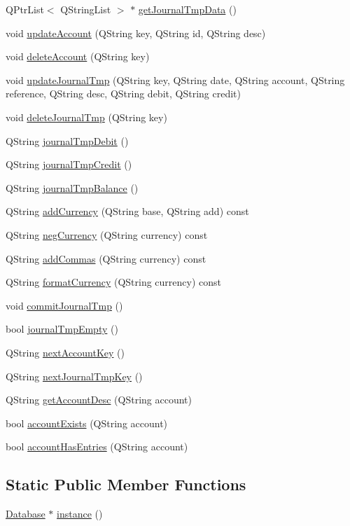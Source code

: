 \begin{CompactItemize}
\item 
QPtr\-List$<$ QString\-List $>$ $\ast$ \hyperlink{classDatabase_a38}{get\-Journal\-Tmp\-Data} ()
\item 
void \hyperlink{classDatabase_a39}{update\-Account} (QString key, QString id, QString desc)
\item 
void \hyperlink{classDatabase_a40}{delete\-Account} (QString key)
\item 
void \hyperlink{classDatabase_a41}{update\-Journal\-Tmp} (QString key, QString date, QString account, QString reference, QString desc, QString debit, QString credit)
\item 
void \hyperlink{classDatabase_a42}{delete\-Journal\-Tmp} (QString key)
\item 
QString \hyperlink{classDatabase_a43}{journal\-Tmp\-Debit} ()
\item 
QString \hyperlink{classDatabase_a44}{journal\-Tmp\-Credit} ()
\item 
QString \hyperlink{classDatabase_a45}{journal\-Tmp\-Balance} ()
\item 
QString \hyperlink{classDatabase_a46}{add\-Currency} (QString base, QString add) const
\item 
QString \hyperlink{classDatabase_a47}{neg\-Currency} (QString currency) const
\item 
QString \hyperlink{classDatabase_a48}{add\-Commas} (QString currency) const
\item 
QString \hyperlink{classDatabase_a49}{format\-Currency} (QString currency) const
\item 
void \hyperlink{classDatabase_a50}{commit\-Journal\-Tmp} ()
\item 
bool \hyperlink{classDatabase_a51}{journal\-Tmp\-Empty} ()
\item 
QString \hyperlink{classDatabase_a52}{next\-Account\-Key} ()
\item 
QString \hyperlink{classDatabase_a53}{next\-Journal\-Tmp\-Key} ()
\item 
QString \hyperlink{classDatabase_a54}{get\-Account\-Desc} (QString account)
\item 
bool \hyperlink{classDatabase_a55}{account\-Exists} (QString account)
\item 
bool \hyperlink{classDatabase_a56}{account\-Has\-Entries} (QString account)
\end{CompactItemize}
\subsection*{Static Public Member Functions}
\begin{CompactItemize}
\item 
\hyperlink{classDatabase}{Database} $\ast$ \hyperlink{classDatabase_e0}{instance} ()
\end{CompactItemize}
